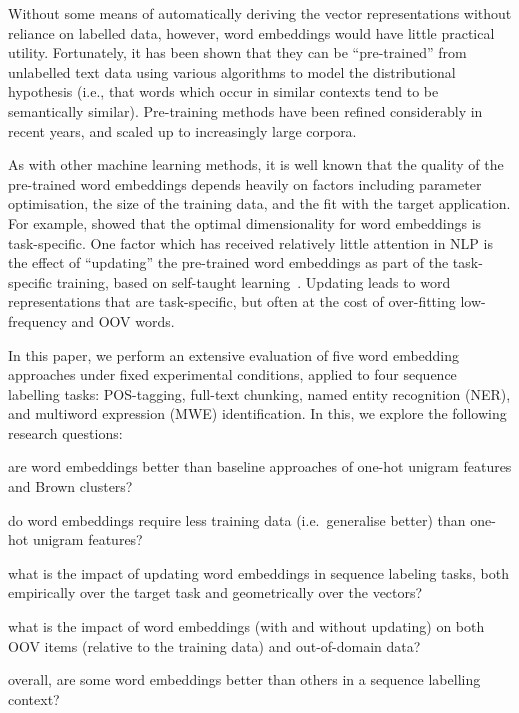\documentclass[11pt]{article}
\begin{document}
Without some means of automatically deriving the vector representations
without reliance on labelled data, however, word embeddings would have
little practical utility. Fortunately, it has been shown that they can
be ``pre-trained'' from unlabelled text data using various algorithms 
to model the distributional hypothesis (i.e., that
words which occur in similar contexts tend to be semantically
similar). Pre-training methods have been refined considerably in recent
years, and scaled up to increasingly large corpora.

As with other machine learning methods, it is well known that the
quality of the pre-trained word embeddings depends heavily on factors
including parameter optimisation, the size of the training data, and the
fit with the target application. For example, 
showed that the optimal dimensionality for word embeddings is task-specific.  
One factor which has received relatively little attention in
NLP is the effect of ``updating'' the pre-trained word embeddings as
part of the task-specific training, based on self-taught
learning~\cite{raina2007self}.  Updating leads to word
representations that are task-specific, but often at the cost of
over-fitting low-frequency and OOV words.


In this paper, we perform an extensive evaluation of five word embedding
approaches under fixed experimental conditions, applied to four sequence
labelling tasks: POS-tagging, full-text chunking, named entity
recognition (NER), and multiword expression (MWE) identification. In
this, we explore the following research questions:
\begin{compactenum}[\bf RQ1:]
\item are word embeddings better than baseline approaches of one-hot
  unigram features and Brown clusters?
\item do word embeddings require less training data (i.e.\ generalise
  better) than one-hot unigram features?
\item what is the impact of updating word embeddings in sequence
  labeling tasks, both empirically over the target task and
  geometrically over the vectors?
\item what is the impact of word embeddings (with and without
  updating) on both OOV items (relative to the training data) and
  out-of-domain data?
\item overall, are some word embeddings better than others in a sequence
  labelling context?
\end{compactenum}
\end{document}
